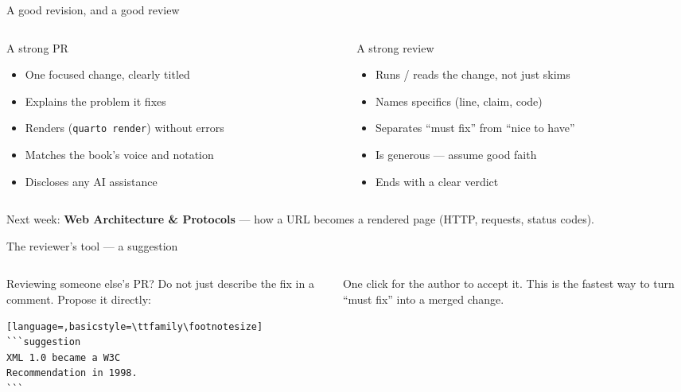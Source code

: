 \documentclass[9pt,aspectratio=169]{beamer}
\begin{document}
\begin{frame}{A good revision, and a good review}
    \begin{columns}[T]
        \begin{column}{0.45\textwidth}
            \begin{block}{A strong PR}
                \begin{itemize}\small
                    \item One focused change, clearly titled
                    \item Explains the problem it fixes
                    \item Renders (\texttt{quarto render}) without errors
                    \item Matches the book's voice and notation
                    \item Discloses any AI assistance
                \end{itemize}
            \end{block}
        \end{column}
        \begin{column}{0.45\textwidth}
            \begin{block}{A strong review}
                \begin{itemize}\small
                    \item Runs / reads the change, not just skims
                    \item Names specifics (line, claim, code)
                    \item Separates ``must fix'' from ``nice to have''
                    \item Is generous --- assume good faith
                    \item Ends with a clear verdict
                \end{itemize}
            \end{block}
        \end{column}
    \end{columns}
    \medskip
    \centering\small Next week: \textbf{Web Architecture \& Protocols} --- how a URL becomes a rendered page (HTTP, requests, status codes).
\end{frame}

\begin{frame}[fragile]{The reviewer's tool --- a suggestion}
    \begin{columns}[T]
        \begin{column}{0.55\textwidth}
            Reviewing someone else's PR? Do not just describe the fix in a comment. Propose it directly:
\begin{lstlisting}[language=,basicstyle=\ttfamily\footnotesize]
```suggestion
XML 1.0 became a W3C
Recommendation in 1998.
```
\end{lstlisting}
        \end{column}
        \begin{column}{0.4\textwidth}
            One click for the author to accept it. This is the fastest way to turn ``must fix'' into a merged change.
        \end{column}
    \end{columns}
\end{frame}
\end{document}

